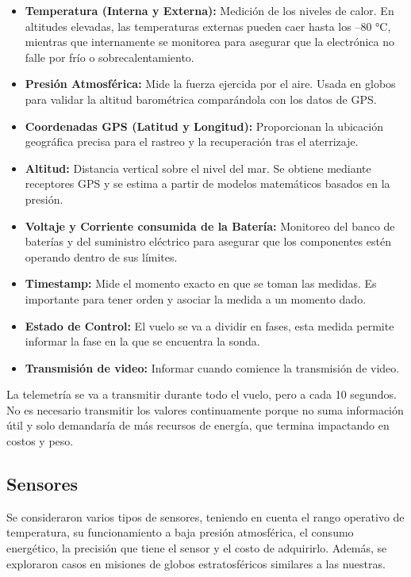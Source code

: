 \documentclass[12pt,a4paper]{article}
\begin{document}
\begin{itemize}
\item
  \textbf{Temperatura (Interna y Externa):} Medición de los niveles de calor. En altitudes elevadas, las temperaturas externas pueden caer hasta los --80 °C, mientras que internamente se monitorea para asegurar que la electrónica no falle por frío o sobrecalentamiento.
\item
  \textbf{Presión Atmosférica:} Mide la fuerza ejercida por el aire. Usada en globos para validar la altitud barométrica comparándola con los datos de GPS.
\item
  \textbf{Coordenadas GPS (Latitud y Longitud):} Proporcionan la ubicación geográfica precisa para el rastreo y la recuperación tras el aterrizaje.
\item
  \textbf{Altitud:} Distancia vertical sobre el nivel del mar. Se obtiene mediante receptores GPS y se estima a partir de modelos matemáticos basados en la presión.
\item
  \textbf{Voltaje y Corriente consumida de la Batería:} Monitoreo del banco de baterías y del suministro eléctrico para asegurar que los componentes estén operando dentro de sus límites.
\item
  \textbf{Timestamp:} Mide el momento exacto en que se toman las medidas. Es importante para tener orden y asociar la medida a un momento dado.
\item
  \textbf{Estado de Control:} El vuelo se va a dividir en fases, esta medida permite informar la fase en la que se encuentra la sonda.
\item
  \textbf{Transmisión de video:} Informar cuando comience la transmisión de video.
\end{itemize}

La telemetría se va a transmitir durante todo el vuelo, pero a cada 10 segundos. No es necesario transmitir los valores continuamente porque no suma información útil y solo demandaría de más recursos de energía, que termina impactando en costos y peso.

\subsection{Sensores}\label{sensores}

Se consideraron varios tipos de sensores, teniendo en cuenta el rango operativo de temperatura, su funcionamiento a baja presión atmosférica, el consumo energético, la precisión que tiene el sensor y el costo de adquirirlo. Además, se exploraron casos en misiones de globos estratosféricos similares a las nuestras.
\end{document}
